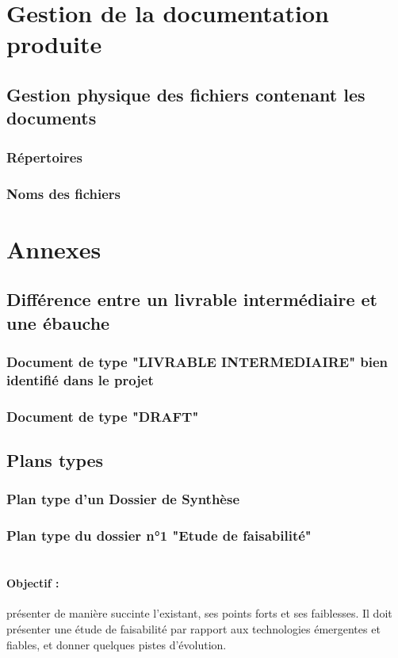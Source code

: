 \section{Gestion de la documentation produite}
  \subsection{Gestion physique des fichiers contenant les documents}     
    \subsubsection{Répertoires}
    \subsubsection{Noms des fichiers}
    
    
\section{Annexes}
  \subsection{Différence entre un livrable intermédiaire et une ébauche}     
    \subsubsection{Document de type "LIVRABLE INTERMEDIAIRE" bien identifié dans le projet}
    \subsubsection{Document de type "DRAFT"}
  
  \subsection{Plans types}     
    \subsubsection{Plan type d'un Dossier de Synthèse}
    
    \subsubsection{Plan type du dossier n°1 "Etude de faisabilité"}
      \paragraph*{\\Objectif :}
        présenter de manière succinte l'existant, ses points forts et ses faiblesses. Il doit
        présenter une étude de faisabilité par rapport aux technologies émergentes et fiables, et donner quelques pistes d'évolution.

